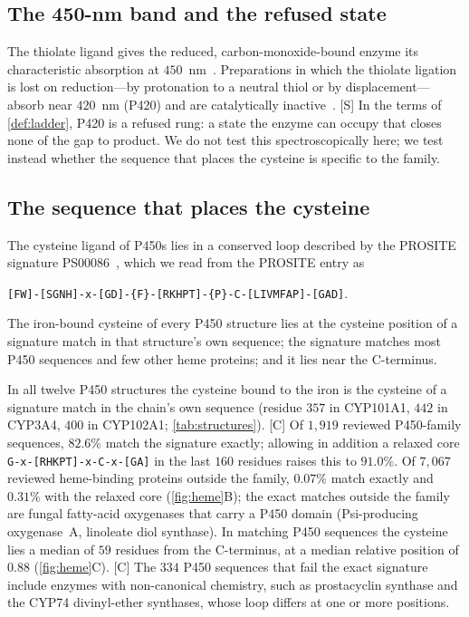 \documentclass[10pt,twocolumn,a4paper]{article}
\newcommand{\Sup}{\textsf{[S]}}
\newcommand{\C}{\textsf{[C]}}
\begin{document}
\subsection{The 450-nm band and the refused state}

The thiolate ligand gives the reduced, carbon-monoxide-bound enzyme its
characteristic absorption at $450$~nm~\citep{omura1964}. Preparations in
which the thiolate ligation is lost on reduction---by protonation to a
neutral thiol or by displacement---absorb near $420$~nm (P420) and are
catalytically inactive~\citep{perera2003}. \Sup{} In the terms of
\cref{def:ladder}, P420 is a refused rung: a state the enzyme can occupy that
closes none of the gap to product. We do not test this spectroscopically
here; we test instead whether the sequence that places the cysteine is
specific to the family.

\subsection{The sequence that places the cysteine}

The cysteine ligand of P450s lies in a conserved loop described by the
PROSITE signature PS00086~\citep{sigrist2013}, which we read from the PROSITE
entry as
\begin{center}
{\footnotesize\texttt{[FW]-[SGNH]-x-[GD]-\{F\}-[RKHPT]-\{P\}-C-[LIVMFAP]-[GAD]}}.
\end{center}

\begin{prediction}[Signature]
\label{pred:signature}
The iron-bound cysteine of every P450 structure lies at the cysteine position
of a signature match in that structure's own sequence; the signature matches
most P450 sequences and few other heme proteins; and it lies near the
C-terminus.
\end{prediction}

In all twelve P450 structures the cysteine bound to the iron is the
cysteine of a signature match in the chain's own sequence (residue $357$ in
CYP101A1, $442$ in CYP3A4, $400$ in CYP102A1; \cref{tab:structures}). \C{} Of
$1{,}919$ reviewed P450-family sequences, $82.6\%$ match the signature
exactly; allowing in addition a relaxed core \texttt{G-x-[RHKPT]-x-C-x-[GA]}
in the last $160$ residues raises this to $91.0\%$. Of $7{,}067$ reviewed
heme-binding proteins outside the family, $0.07\%$ match exactly and $0.31\%$
with the relaxed core (\cref{fig:heme}B); the exact matches outside the
family are fungal fatty-acid oxygenases that carry a P450 domain (Psi-producing
oxygenase~A, linoleate diol synthase). In matching P450 sequences the
cysteine lies a median of $59$ residues from the C-terminus, at a median
relative position of $0.88$ (\cref{fig:heme}C). \C{} The $334$ P450 sequences that
fail the exact signature include enzymes with non-canonical chemistry, such
as prostacyclin synthase and the CYP74 divinyl-ether synthases, whose loop
differs at one or more positions.
\end{document}
